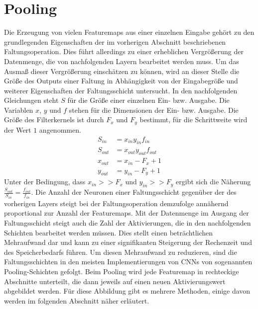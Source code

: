 \documentclass[../main.tex]{subfiles}
\begin{document}
\section{Pooling}
Die Erzeugung von vielen Featuremaps aus einer einzelnen Eingabe gehört zu den grundlegenden Eigenschaften der im vorherigen Abschnitt beschriebenen Faltungsoperation. Dies führt allerdings zu einer erheblichen Vergrößerung der Datenmenge, die von nachfolgenden Layern bearbeitet werden muss. Um das Ausmaß dieser Vergrößerung einschätzen zu können, wird an dieser Stelle die Größe des Outputs einer Faltung in Abhängigkeit von der Eingabegröße und weiterer Eigenschaften der Faltungsschicht untersucht. 
In den nachfolgenden Gleichungen steht \(S\) für die Größe einer einzelnen Ein- bzw. Ausgabe. Die Variablen \(x\), \(y\) und \(f\) stehen für die Dimensionen der Ein- bzw. Ausgabe. Die Größe des Filterkernels ist durch \(F_x\) und \(F_y\) bestimmt, für die Schrittweite wird der Wert \(1\) angenommen. 
\begin{equation}
\begin{split}
S_{in} &= x_{in} y_{in} f_{in}\\
S_{out} &= x_{out} y_{out} f_{out}\\
x_{out} &= x_{in} - F_x + 1\\
y_{out} &= y_{in} - F_y + 1
\end{split}
\end{equation}
Unter der Bedingung, dass \(x_{in} >> F_x\) und \(y_{in} >> F_y\) ergibt sich die Näherung \(\frac{S_{out}}{S_{in}} = \frac{f_{out}}{f_{in}}\). Die Anzahl der Neuronen einer Faltungsschicht gegenüber der des vorherigen Layers steigt bei der Faltungsoperation demzufolge annähernd proportional zur Anzahl der Featuremaps. 
Mit der Datenmenge im Ausgang der Faltungsschicht steigt auch die Zahl der Aktivierungen, die in den nachfolgenden Schichten bearbeitet werden müssen. Dies stellt einen beträchtlichen Mehraufwand dar und kann zu einer signifikanten Steigerung der Rechenzeit und des Speicherbedarfs führen. Um diesen Mehraufwand zu reduzieren, sind die Faltungsschichten in den meisten Implementierungen von CNNs von sogenannten Pooling-Schichten gefolgt. Beim Pooling wird jede Featuremap in rechteckige Abschnitte unterteilt, die dann jeweils auf einen neuen Aktivierungswert abgebildet werden. Für diese Abbildung gibt es mehrere Methoden, einige davon werden im folgenden Abschnitt näher erläutert. 
\end{document}
